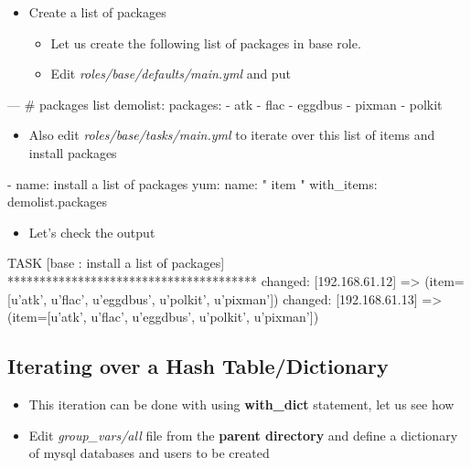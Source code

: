 \begin{itemize}
\item Create a list of packages


\begin{itemize}
\item Let us create the following list of packages in base role.
\item Edit \emph{roles/base/defaults/main.yml} and put
\end{itemize}
\end{itemize}

\begin{code}
---
# packages list
demolist:
  packages:
    - atk
    - flac
    - eggdbus
    - pixman
    - polkit
\end{code}

\begin{itemize}
\item Also edit \emph{roles/base/tasks/main.yml} to iterate over this list of items and install packages
\end{itemize}

\begin{code}
- name: install a list of packages
  yum:
    name: "{{ item }}"
  with_items: {{ demolist.packages }}
\end{code}

\begin{itemize}
\item Let's check the output
\end{itemize}

\begin{code}
TASK [base : install a list of packages] ***************************************
changed: [192.168.61.12] => (item=[u'atk', u'flac', u'eggdbus', u'polkit', u'pixman'])
changed: [192.168.61.13] => (item=[u'atk', u'flac', u'eggdbus', u'polkit', u'pixman'])
\end{code}

\subsection{Iterating over a Hash Table/Dictionary}

\begin{itemize}
\item This iteration can be done with using \textbf{with\_dict} statement, let us see how
\item Edit \emph{group\_vars/all} file from the \textbf{parent directory} and define a dictionary of mysql databases and users to be created
\end{itemize}

